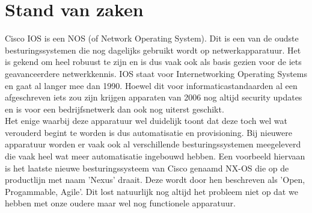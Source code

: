 


\section{Stand van zaken}
\label{sec:stand-van-zaken}
Cisco IOS is een NOS (of Network Operating System). Dit is een van de oudste besturingssystemen die nog dagelijks gebruikt wordt op netwerkapparatuur. Het is gekend om heel robuust te zijn en is dus vaak ook als basis gezien voor de iets geavanceerdere netwerkkennis. IOS staat voor Internetworking Operating Systems en gaat al langer mee dan 1990. Hoewel dit voor informaticastandaarden al een afgeschreven iets zou zijn krijgen apparaten van 2006 nog altijd security updates en is voor een bedrijfsnetwerk dan ook nog uiterst geschikt. \autocite{historyOfCiscoCli} 
\\

Het enige waarbij deze apparatuur wel duidelijk toont dat deze toch wel wat verouderd begint te worden is dus automatisatie en  provisioning. Bij nieuwere apparatuur worden er vaak ook al verschillende besturingssystemen meegeleverd die vaak heel wat meer automatisatie ingebouwd hebben. Een voorbeeld hiervaan is het laatste nieuwe besturingssysteem van Cisco genaamd NX-OS die op de productlijn met naam 'Nexus' draait. Deze wordt door hen beschreven als 'Open, Progammable,  Agile'. Dit lost natuurlijk nog altijd het probleem niet op dat we hebben met onze oudere maar wel nog functionele apparatuur. \autocite{ciscoNxos}
\\

